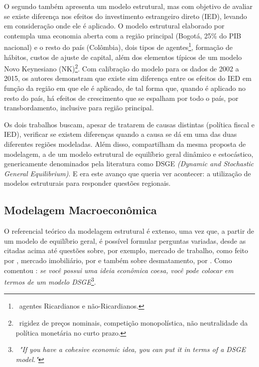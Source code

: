 \documentclass[12pt]{article}
\numberwithin{equation}{section}
\theoremstyle{definition}
\begin{document}
O segundo também apresenta um modelo estrutural, mas com objetivo de avaliar se existe diferença nos efeitos do investimento estrangeiro direto (IED), levando em consideração onde ele é aplicado. O modelo estrutural elaborado por \textcite{mora_fdi_2019} contempla uma economia aberta com a região principal (Bogotá, 25\% do PIB nacional) e o resto do país (Colômbia), dois tipos de agentes\footnote{$\,$ agentes Ricardianos e não-Ricardianos.}, formação de hábitos, custos de ajuste de capital, além dos elementos típicos de um modelo Novo Keynesiano (NK)\footnote{$\,$ rigidez de preços nominais, competição monopolística, não neutralidade da política monetária no curto prazo.}. Com calibração do modelo para os dados de 2002 a 2015, os autores demonstram que existe sim diferença entre os efeitos do IED em função da região em que ele é aplicado, de tal forma que, quando é aplicado no resto do país, há efeitos de crescimento que se espalham por todo o país, por transbordamento, inclusive para região principal.

Os dois trabalhos buscam, apesar de tratarem de causas distintas (política fiscal e IED), verificar se existem diferenças quando a causa se dá em uma das duas diferentes regiões modeladas. Além disso, compartilham da mesma proposta de modelagem, a de um modelo estrutural de equilíbrio geral dinâmico e estocástico, genericamente denominados pela literatura como DSGE \textit{(Dynamic and Stochastic General Equilibrium)}. E era este avanço que \textcite{rickman_modern_2010} queria ver acontecer: a utilização de modelos estruturais para responder questões regionais.

\subsection{Modelagem Macroeconômica}

O referencial teórico da modelagem estrutural é extenso, uma vez que, a partir de um modelo de equilíbrio geral, é possível formular perguntas variadas, desde as citadas acima até questões sobre, por exemplo, mercado de trabalho, como feito por \textcite{ribeiro_alongamento_2023}, mercado imobiliário, por \textcite{albuquerquemello_mercado_2018} e também sobre desmatamento, por \textcite{pereira_desmatamento_2013}. Como comentou \textcite{solis-garcia_ucb_2022}: \textit{se você possui uma ideia econômica coesa, você pode colocar em termos de um modelo DSGE}\footnote{$\,$ \textit{"If you have a cohesive economic idea, you can put it in terms of a DSGE model."}}.
\end{document}
